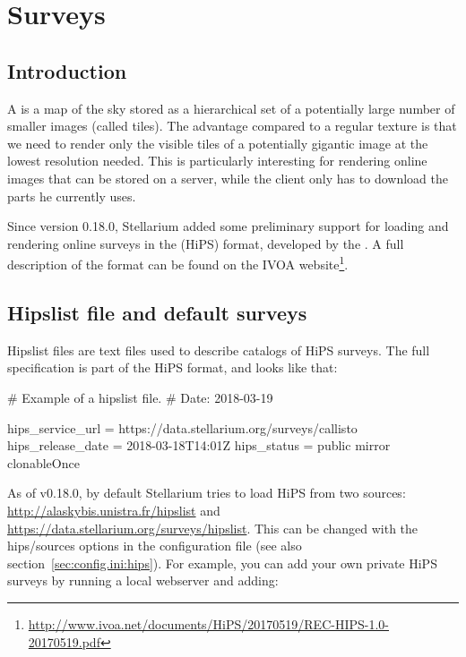 
\chapter{Surveys}
\label{ch:surveys}

\section{Introduction}
\label{sec:surveys:introduction}


A   is a map of the sky stored as a hierarchical set of a potentially
large number of smaller images (called tiles).  The advantage compared to a
regular texture is that we need to render only the visible tiles of a potentially gigantic image at the
lowest resolution needed.  This is particularly interesting for rendering
online images that can be stored on a server, while the client only has
to download the parts he currently uses.

Since version 0.18.0, Stellarium added some preliminary support for loading and
rendering online surveys in the  (HiPS) format,
developed by the .
A full description of the format can be found on the IVOA website\footnote{%
\url{http://www.ivoa.net/documents/HiPS/20170519/REC-HIPS-1.0-20170519.pdf}}.

\section{Hipslist file and default surveys}
\label{sec:surveys:hipslistFile}

Hipslist files are text files used to describe catalogs of HiPS surveys.  The
full specification is part of the HiPS format, and looks like that:

\begin{configfileScr}
# Example of a hipslist file.
# Date: 2018-03-19

hips_service_url  = https://data.stellarium.org/surveys/callisto
hips_release_date = 2018-03-18T14:01Z
hips_status       = public mirror clonableOnce
\end{configfileScr}

As of v0.18.0, by default Stellarium tries to load HiPS from two sources:
\url{http://alaskybis.unistra.fr/hipslist} and
\url{https://data.stellarium.org/surveys/hipslist}.
This can be changed with the hips/sources options in the configuration
file (see also section~\ref{sec:config.ini:hips}).  For example, you can add your
own private HiPS surveys by running a local webserver and adding:

